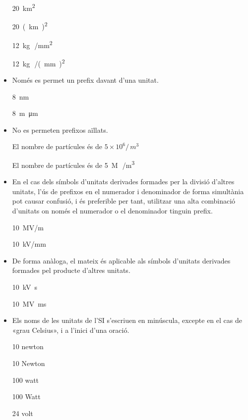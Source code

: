 \begin{itemize}
\textcolor{Green}\faCheckSquare{} \SI{20}{km^2}

\textcolor{Red}\faTimesCircle{} \SI{20}{(km)^2}

\textcolor{Green}\faCheckSquare{}  \SI{12}{kg\,/mm^2}

\textcolor{Red}\faTimesCircle{}  \SI{12}{kg\,/(mm)^2}


\item Només es permet un prefix davant d'una unitat.

\textcolor{Green}\faCheckSquare{} \SI{8}{nm}

\textcolor{Red}\faTimesCircle{} \SI{8}{m\micro m}


\item No es permeten prefixos aïllats.

\textcolor{Green}\faCheckSquare{} El nombre de partícules és de $5\times 10^6 /\si{\,m^3}$

\textcolor{Red}\faTimesCircle{} El nombre de partícules és de \SI{5}{M\,/m^3}


\item En el cas dels símbols d'unitats derivades formades per la divisió
d'altres unitats, l'ús de prefixos en el numerador i denominador de
forma simultània pot causar confusió, i és preferible per tant,
utilitzar una alta combinació d'unitats on només el numerador o el
denominador tinguin prefix.

\textcolor{Green}\faCheckSquare{} \SI{10}{MV/m}

\textcolor{Blue}\faExclamationTriangle{}  \SI{10}{kV/mm}


\item De forma anàloga, el mateix és aplicable als símbols d'unitats
derivades formades pel producte d'altres unitats.

\textcolor{Green}\faCheckSquare{} \SI{10}{kV.s}

\textcolor{Blue}\faExclamationTriangle{}  \SI{10}{MV.ms}


\item Els noms de les unitats de l'SI s'escriuen en minúscula, excepte en
el cas de «grau Celsius», i a l'inici d'una oració.

\textcolor{Green}\faCheckSquare{} 10 newton

\textcolor{Red}\faTimesCircle{} 10 Newton

\textcolor{Green}\faCheckSquare{}  100 watt

\textcolor{Red}\faTimesCircle{} 100 Watt

\textcolor{Green}\faCheckSquare{}  24 volt


\end{itemize}

